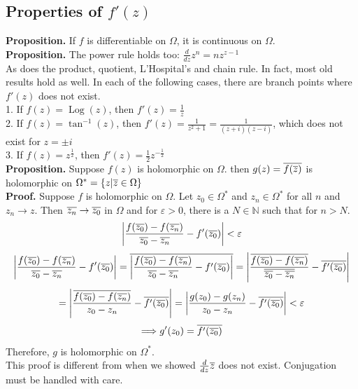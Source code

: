 \documentclass[11pt]{article}
\DeclarePairedDelimiter\abs{\lvert}{\rvert}
\begin{document}
\subsection{Properties of $f'(z)$}
\textbf{Proposition.} If $f$ is differentiable on $\Omega$, it is continuous on $\Omega$. \\
\textbf{Proposition.} The power rule holds too: $\frac{d}{dz}z^n = nz^{z - 1}$\\
As does the product, quotient, L'Hospital's and chain rule. In fact, most old results hold as well. 
In each of the following cases, there are branch points where $f'(z)$ does not exist. \\
1. If $f(z) = \operatorname{Log}(z)$, then $f'(z) = \frac{1}{z}$ \\
2. If $f(z) = \tan^{-1}(z)$, then $f'(z) = \frac{1}{z^2 + 1} = \frac{1}{(z + i)(z - i)}$, which does not exist for $z = \pm i$ \\
3. If $f(z) = z^\frac{1}{2}$, then $f'(z) = \frac{1}{2}z^{-\frac{1}{2}}$ \\

\textbf{Proposition.} Suppose $f(z)$ is holomorphic on $\Omega$. then $g(z) = \overline{f(\overline{z})}$ is holomorphic on $\Omega^{\ast} = \{z|\overline{z} \in \Omega\}$ \\
\textbf{Proof.} Suppose $f$ is holomorphic on $\Omega$. Let $z_0 \in \Omega^{\ast}$ and $z_n \in \Omega^{\ast}$ for all $n$ and $z_n \to z$. Then $\overline{z_n} \to \overline{z_0}$ in $\Omega$ and for $\varepsilon > 0$, there is a $N \in \mathbb{N}$ such that for $n > N$. 
$$\abs*{\frac{f(\conj{z_0}) - f(\conj{z_n})}{\conj{z_0} - \conj{z_n}} - f'(\conj{z_0})} < \varepsilon$$ 
$$\abs*{\frac{f(\conj{z_0}) - f(\conj{z_n})}{\conj{z_0} - \conj{z_n}} - f'(\conj{z_0})} = \conj{\abs*{\frac{f(\conj{z_0}) - f(\conj{z_n})}{\conj{z_0} - \conj{z_n}} - f'(\conj{z_0})}} = \abs*{\frac{\conj{{f(\conj{z_0}) - f(\conj{z_n})}}}{\conj{\conj{z_0} - \conj{z_n}}} - \conj{f'(\conj{z_0})}} $$
$$ = \abs*{\frac{\conj{{f(\conj{z_0}) - f(\conj{z_n})}}}{z_0 - z_n} - \conj{f'(\conj{z_0})}} = \abs*{\frac{g(z_0) - g(z_n)}{z_0 - z_n} - \conj{f'(\conj{z_0})}} < \varepsilon$$
$$\Longrightarrow g'(z_0) = \overline{f'(\overline{z_0})}$$
Therefore, $g$ is holomorphic on $\Omega^\ast$. \\
This proof is different from when we showed $\frac{d}{dz}\overline{z}$ does not exist. Conjugation must be handled with care. 
\end{document}
